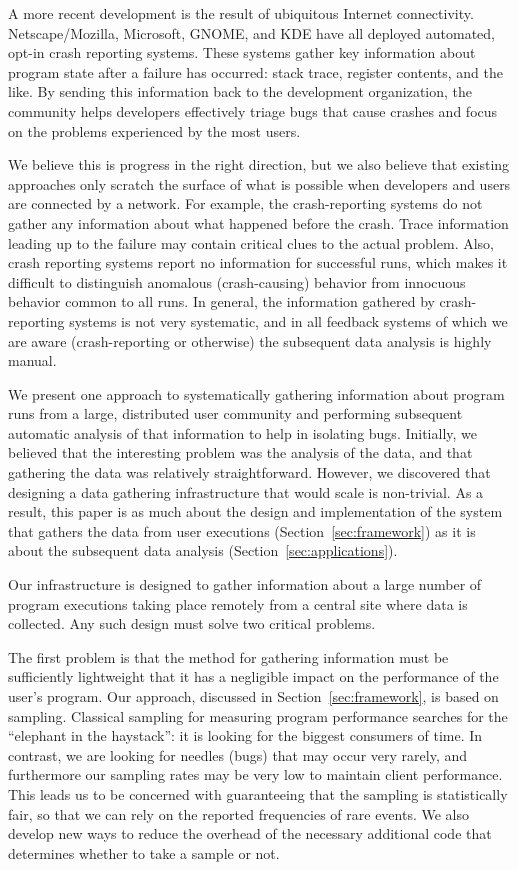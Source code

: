 A more recent development is the result of ubiquitous Internet
connectivity.  Netscape/Mozilla, Microsoft, GNOME, and KDE have all
deployed automated, opt-in crash reporting systems.  These systems
gather key information about program state after a failure has
occurred: stack trace, register contents, and the like.  By sending
this information back to the development organization, the community
helps developers effectively triage bugs that cause crashes and focus
on the problems experienced by the most users.

We believe this is progress in the right direction, but we also
believe that existing approaches only scratch the surface of what is
possible when developers and users are connected by a network.  For
example, the crash-reporting systems do not gather any information
about what happened before the crash.  Trace information leading up to
the failure may contain critical clues to the actual problem.  Also,
crash reporting systems report no information for successful runs,
which makes it difficult to distinguish anomalous (crash-causing)
behavior from innocuous behavior common to all runs.  In general, the
information gathered by crash-reporting systems is not very
systematic, and in all feedback systems of which we are aware
(crash-reporting or otherwise) the subsequent data analysis is highly
manual.

We present one approach to systematically gathering information about
program runs from a large, distributed user community and performing
subsequent automatic analysis of that information to help in isolating
bugs.  Initially, we believed that the interesting problem was the
analysis of the data, and that gathering the data was relatively
straightforward.  However, we discovered that designing a data
gathering infrastructure that would scale is non-trivial.  As a
result, this paper is as much about the design and implementation of
the system that gathers the data from user executions
(Section~\ref{sec:framework}) as it is about the subsequent data
analysis (Section~\ref{sec:applications}).

Our infrastructure is designed to gather information about a large
number of program executions taking place remotely from a central site
where data is collected.  Any such design must solve two critical
problems.

The first problem is that the method for gathering information must be
sufficiently lightweight that it has a negligible impact on the
performance of the user's program.  Our approach, discussed in
Section~\ref{sec:framework}, is based on sampling.  Classical sampling
for measuring program performance searches for the ``elephant in the
haystack'': it is looking for the biggest consumers of time.  In
contrast, we are looking for needles (bugs) that may occur very
rarely, and furthermore our sampling rates may be very low to maintain
client performance.  This leads us to be concerned with guaranteeing
that the sampling is statistically fair, so that we can rely on the
reported frequencies of rare events.  We also develop new ways to
reduce the overhead of the necessary additional code that determines
whether to take a sample or not.


